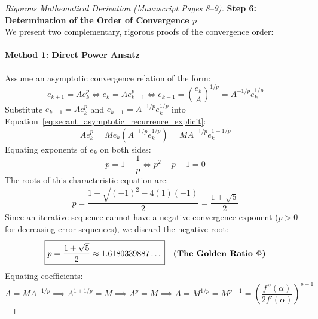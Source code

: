 \begin{proof}[Rigorous Mathematical Derivation (Manuscript Pages 8--9)]
\noindent\textbf{Step 6: Determination of the Order of Convergence $p$} \\
We present two complementary, rigorous proofs of the convergence order:

\paragraph{Method 1: Direct Power Ansatz}
Assume an asymptotic convergence relation of the form:
\begin{equation}
    e_{k+1} = A e_k^p \iff e_k = A e_{k-1}^p \iff e_{k-1} = \left(\frac{e_k}{A}\right)^{1/p} = A^{-1/p} e_k^{1/p}
\end{equation}
Substitute $e_{k+1} = A e_k^p$ and $e_{k-1} = A^{-1/p} e_k^{1/p}$ into Equation~\eqref{eq:secant_asymptotic_recurrence_explicit}:
\begin{equation}
    A e_k^p = M e_k \left( A^{-1/p} e_k^{1/p} \right) = M A^{-1/p} e_k^{1 + 1/p}
\end{equation}
Equating exponents of $e_k$ on both sides:
\begin{equation}
    p = 1 + \frac{1}{p} \iff p^2 - p - 1 = 0
\end{equation}
The roots of this characteristic equation are:
\begin{equation}
    p = \frac{1 \pm \sqrt{(-1)^2 - 4(1)(-1)}}{2} = \frac{1 \pm \sqrt{5}}{2}
\end{equation}
Since an iterative sequence cannot have a negative convergence exponent ($p > 0$ for decreasing error sequences), we discard the negative root:
\begin{equation}
    \boxed{p = \frac{1 + \sqrt{5}}{2} \approx 1.6180339887\dots} \quad \text{\textbf{(The Golden Ratio $\Phi$)}}
\end{equation}
Equating coefficients:
\begin{equation}
    A = M A^{-1/p} \implies A^{1 + 1/p} = M \implies A^p = M \implies A = M^{1/p} = M^{p-1} = \left( \frac{f''(\alpha)}{2 f'(\alpha)} \right)^{p-1}
\end{equation}


\end{proof}
